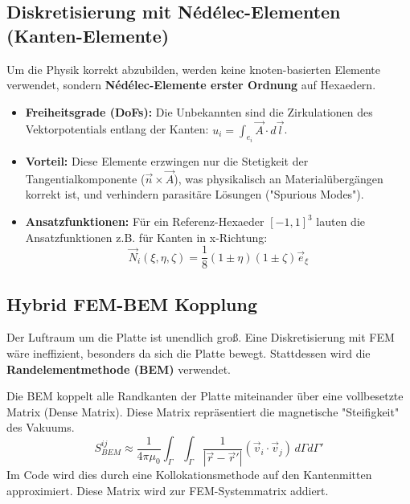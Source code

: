 \documentclass[a4paper,12pt]{article}
\begin{document}
\subsection{Diskretisierung mit Nédélec-Elementen (Kanten-Elemente)}
Um die Physik korrekt abzubilden, werden keine knoten-basierten Elemente verwendet, sondern \textbf{Nédélec-Elemente erster Ordnung} auf Hexaedern. 
\begin{itemize}
    \item \textbf{Freiheitsgrade (DoFs):} Die Unbekannten sind die Zirkulationen des Vektorpotentials entlang der Kanten: $u_i = \int_{e_i} \vec{A} \cdot d\vec{l}$.
    \item \textbf{Vorteil:} Diese Elemente erzwingen nur die Stetigkeit der Tangentialkomponente ($\vec{n} \times \vec{A}$), was physikalisch an Materialübergängen korrekt ist, und verhindern parasitäre Lösungen ("Spurious Modes").
    \item \textbf{Ansatzfunktionen:} Für ein Referenz-Hexaeder $[-1,1]^3$ lauten die Ansatzfunktionen z.B. für Kanten in x-Richtung:
    \begin{equation}
        \vec{N}_i(\xi, \eta, \zeta) = \frac{1}{8} (1 \pm \eta)(1 \pm \zeta) \vec{e}_\xi
    \end{equation}
\end{itemize}

\subsection{Hybrid FEM-BEM Kopplung}
Der Luftraum um die Platte ist unendlich groß. Eine Diskretisierung mit FEM wäre ineffizient, besonders da sich die Platte bewegt. Stattdessen wird die \textbf{Randelementmethode (BEM)} verwendet.

Die BEM koppelt alle Randkanten der Platte miteinander über eine vollbesetzte Matrix (Dense Matrix). Diese Matrix repräsentiert die magnetische "Steifigkeit" des Vakuums.
\begin{equation}
    S_{BEM}^{ij} \approx \frac{1}{4\pi\mu_0} \int_{\Gamma} \int_{\Gamma} \frac{1}{|\vec{r} - \vec{r}'|} (\vec{v}_i \cdot \vec{v}_j) \, d\Gamma d\Gamma'
\end{equation}
Im Code wird dies durch eine Kollokationsmethode auf den Kantenmitten approximiert. Diese Matrix wird zur FEM-Systemmatrix addiert.
\end{document}
